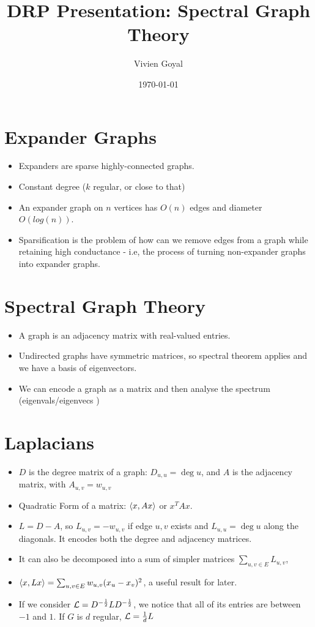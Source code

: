 \documentclass[11pt]{article}
\author{Vivien Goyal}
\date{\today}
\title{DRP Presentation: Spectral Graph Theory}
\begin{document}
\maketitle
\tableofcontents

\section{Expander Graphs}
\label{sec:org2cff622}
\begin{itemize}
\item Expanders are sparse highly-connected graphs.
\item Constant degree (\(k\) regular, or close to that)
\item An expander graph on \(n\) vertices has \(O(n)\) edges and diameter \(O(log(n))\).
\item Sparsification is the problem of how can we remove edges from a graph while retaining high conductance - i.e, the process of turning non-expander graphs into expander graphs.
\end{itemize}
\section{Spectral Graph Theory}
\label{sec:orgd03e8a3}
\begin{itemize}
\item A graph is an adjacency matrix with real-valued entries.
\item Undirected graphs have symmetric matrices, so spectral theorem applies and we have a basis of eigenvectors.
\item We can encode a graph as a matrix and then analyse the spectrum (eigenvals/eigenvecs )
\end{itemize}
\section{Laplacians}
\label{sec:orga7048c9}
\begin{itemize}
\item \(D\) is the degree matrix of a graph: \(D_{u,u}= \deg u\), and \(A\) is the adjacency matrix, with \(A_{u,v}=w_{u,v}\)
\item Quadratic Form of a matrix: \(\langle x , Ax \rangle\) or \(x^TAx\).
\item \(L=D-A\), so \(L_{u,v}=-w_{u,v}\) if edge \(u,v\) exists and \(L_{u,u}=\deg u\)  along the diagonals. It encodes both the degree and adjacency matrices.
\item It can also be decomposed into a sum of simpler matrices  \(\sum_{u,v \in E}L_{u,v}\),
\item \(\langle x , Lx \rangle=\sum_{u,v \in E} w_{u,v}(x_u-x_v)^2\), a useful result for later.
\item If we consider \(\mathcal{L} = D^{-\frac12}LD^{-\frac12}\), we notice that all of its entries are between \(-1\) and \(1\). If \(G\) is \(d\) regular, \(\mathcal{L}=\frac{1}{d}L\)
\end{itemize}
\end{document}
